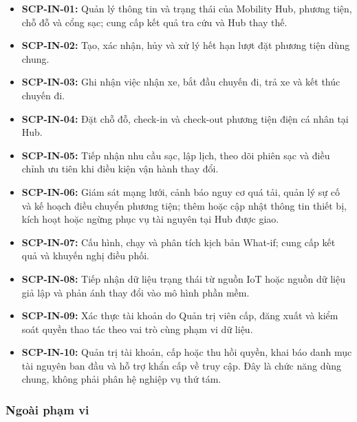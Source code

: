 \begin{itemize}
  \item \textbf{SCP-IN-01:} Quản lý thông tin và trạng thái của Mobility Hub, phương tiện, chỗ đỗ và cổng sạc; cung cấp kết quả tra cứu và Hub thay thế.
  \item \textbf{SCP-IN-02:} Tạo, xác nhận, hủy và xử lý hết hạn lượt đặt phương tiện dùng chung.
  \item \textbf{SCP-IN-03:} Ghi nhận việc nhận xe, bắt đầu chuyến đi, trả xe và kết thúc chuyến đi.
  \item \textbf{SCP-IN-04:} Đặt chỗ đỗ, check-in và check-out phương tiện điện cá nhân tại Hub.
  \item \textbf{SCP-IN-05:} Tiếp nhận nhu cầu sạc, lập lịch, theo dõi phiên sạc và điều chỉnh ưu tiên khi điều kiện vận hành thay đổi.
  \item \textbf{SCP-IN-06:} Giám sát mạng lưới, cảnh báo nguy cơ quá tải, quản lý sự cố và kế hoạch điều chuyển phương tiện; thêm hoặc cập nhật thông tin thiết bị, kích hoạt hoặc ngừng phục vụ tài nguyên tại Hub được giao.
  \item \textbf{SCP-IN-07:} Cấu hình, chạy và phân tích kịch bản What-if; cung cấp kết quả và khuyến nghị điều phối.
  \item \textbf{SCP-IN-08:} Tiếp nhận dữ liệu trạng thái từ nguồn IoT hoặc nguồn dữ liệu giả lập và phản ánh thay đổi vào mô hình phần mềm.
  \item \textbf{SCP-IN-09:} Xác thực tài khoản do Quản trị viên cấp, đăng xuất và kiểm soát quyền thao tác theo vai trò cùng phạm vi dữ liệu.
  \item \textbf{SCP-IN-10:} Quản trị tài khoản, cấp hoặc thu hồi quyền, khai báo danh mục tài nguyên ban đầu và hỗ trợ khẩn cấp về truy cập. Đây là chức năng dùng chung, không phải phân hệ nghiệp vụ thứ tám.
\end{itemize}

\subsubsection*{Ngoài phạm vi}

